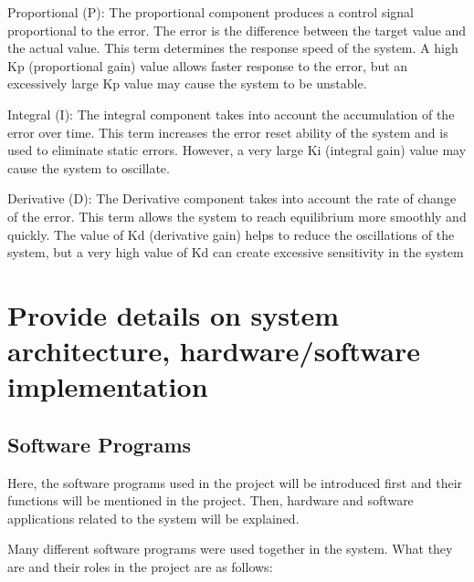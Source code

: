 Proportional (P): The proportional component produces a control signal proportional to the error. The error is the difference between the target value and the actual value. This term determines the response speed of the system. A high Kp (proportional gain) value allows faster response to the error, but an excessively large Kp value may cause the system to be unstable.

Integral (I): The integral component takes into account the accumulation of the error over time. This term increases the error reset ability of the system and is used to eliminate static errors. However, a very large Ki (integral gain) value may cause the system to oscillate.

Derivative (D): The Derivative component takes into account the rate of change of the error. This term allows the system to reach equilibrium more smoothly and quickly. The value of Kd (derivative gain) helps to reduce the oscillations of the system, but a very high value of Kd can create excessive sensitivity in the system

\medskip

\section{Provide details on system architecture, hardware/software implementation}
\subsection{Software Programs}

Here, the software programs used in the project will be introduced first and their functions will be mentioned in the project. Then, hardware and software applications related to the system will be explained.

Many different software programs were used together in the system. What they are and their roles in the project are as follows:

